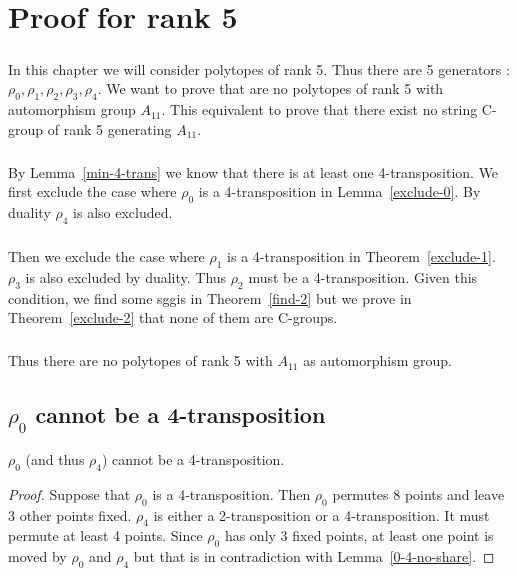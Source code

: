 \chapter{Proof for rank 5}

\paragraph{}
In this chapter we will consider polytopes of rank 5. Thus there are 5 generators : $\rho_0, \rho_1, \rho_2, \rho_3, \rho_4$. We want to prove that are no polytopes of rank 5 with automorphism group $A_{11}$. This equivalent to prove that there exist no string C-group of rank 5 generating $A_{11}$.

\paragraph{}
By Lemma~\ref{min-4-trans} we know that there is at least one 4-transposition. We first exclude the case where $\rho_0$ is a 4-transposition in Lemma~\ref{exclude-0}. By duality $\rho_4$ is also excluded.

\paragraph{}
Then we exclude the case where $\rho_1$ is a 4-transposition in Theorem~\ref{exclude-1}. $\rho_3$ is also excluded by duality. Thus $\rho_2$ must be a 4-transposition. Given this condition, we find some sggis in Theorem~\ref{find-2} but we prove in Theorem~\ref{exclude-2} that none of them are C-groups.

\paragraph{}
Thus there are no polytopes of rank 5 with $A_{11}$ as automorphism group.

\section{$\rho_0$ cannot be a 4-transposition}

\begin{lemma}
  \label{exclude-0}
  $\rho_0$ (and thus $\rho_4$) cannot be a 4-transposition.
\end{lemma}

\begin{proof}
  Suppose that $\rho_0$ is a 4-transposition. Then $\rho_0$ permutes 8 points and leave 3 other points fixed. $\rho_4$ is either a 2-transposition or a 4-transposition. It must permute at least 4 points. Since $\rho_0$ has only 3 fixed points, at least one point is moved by $\rho_0$ and $\rho_4$ but that is in contradiction with Lemma~\ref{0-4-no-share}.
\end{proof}
